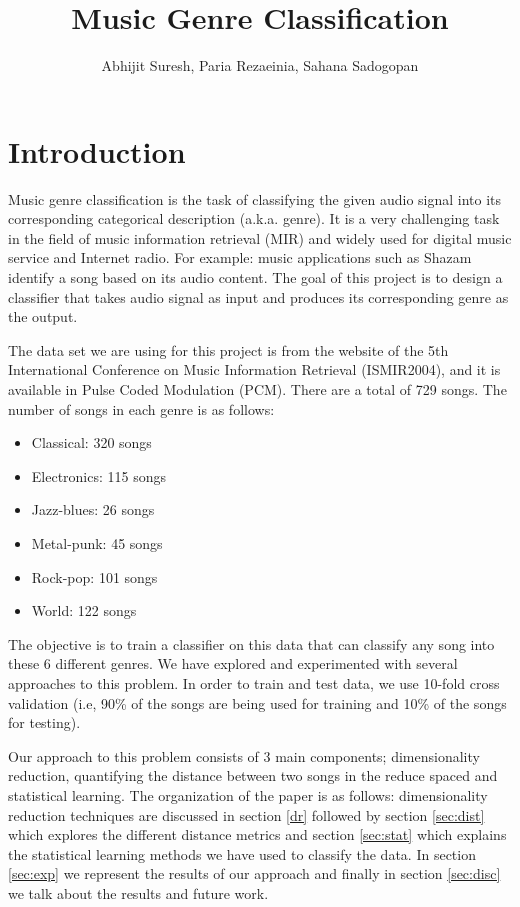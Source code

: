 \documentclass[12pt]{article}
\title{Music Genre Classification}
\author{Abhijit Suresh, Paria Rezaeinia, Sahana Sadogopan}
\begin{document}
	\maketitle

\section{Introduction}
Music genre classification is the task of classifying the given audio signal into its corresponding categorical description (a.k.a. genre). It is a very challenging task in the field of music information retrieval (MIR) and widely used for digital music service and Internet radio. For example: music applications such as Shazam identify a song based on its audio content. The goal of this project is to design a classifier that takes audio signal as input and produces its corresponding genre as the output.

The data set we are using for this project is from the website of the 5th International Conference on Music Information Retrieval (ISMIR2004), and it is available in Pulse Coded Modulation (PCM). There are a total of 729 songs. The number of songs in each genre is as follows:
\begin{itemize}
	\item Classical: 320 songs
	\item Electronics: 115 songs
	\item Jazz-blues: 26 songs
	\item Metal-punk: 45 songs
	\item Rock-pop: 101 songs
	\item World: 122 songs
\end{itemize}
The objective is to train a classifier on this data that can classify any song into these 6 different genres. We have explored and experimented with several approaches to this problem. In order to train and test data, we use 10-fold cross validation (i.e, 90\% of the songs are being used for training  and 10\% of the songs for testing).

Our approach to this problem consists of 3 main components; dimensionality reduction, quantifying the distance between two songs in the reduce spaced and statistical learning. The organization of the paper is as follows: dimensionality reduction techniques are discussed in section \ref{dr} followed by section \ref{sec:dist} which explores the different distance metrics and section \ref{sec:stat} which explains the statistical learning methods we have used to classify the data. In section \ref{sec:exp} we represent the results of our approach and finally in section \ref{sec:disc} we talk about the results and future work.
\end{document}
